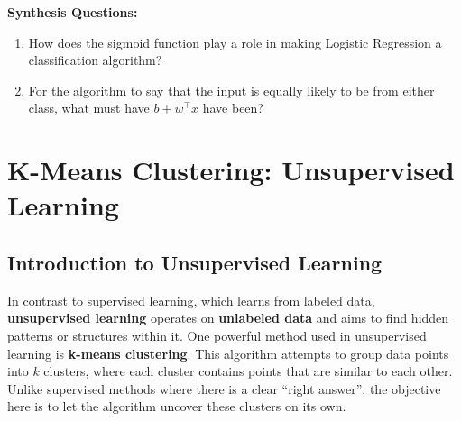 \begin{questionbox}
\textbf{Synthesis Questions:}
\begin{enumerate}
    \item How does the sigmoid function play a role in making Logistic Regression a classification algorithm?
    \item For the algorithm to say that the input is equally likely to be from either class, what must have $b + w^{\top}x$ have been?
\end{enumerate}
\end{questionbox}

\section{K-Means Clustering: Unsupervised Learning}
\subsection{Introduction to Unsupervised Learning}
\begin{flushleft}
    \large In contrast to supervised learning, which learns from labeled data, \textbf{unsupervised learning} operates on \textbf{unlabeled data} and aims to find hidden patterns or structures within it. One powerful method used in unsupervised learning is \textbf{k-means clustering}. This algorithm attempts to group data points into \( k \) clusters, where each cluster contains points that are similar to each other. Unlike supervised methods where there is a clear ``right answer'', the objective here is to let the algorithm uncover these clusters on its own.
\end{flushleft}


